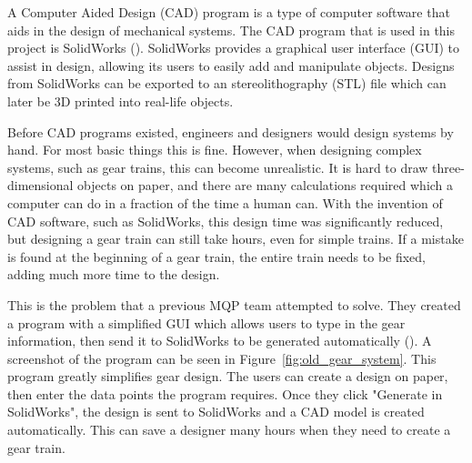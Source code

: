 \begin{doublespace}
A Computer Aided Design (CAD) program is a type of computer software that aids in the design of mechanical systems. The CAD program that is used in this project is SolidWorks (\cite{dassault_systemes_3d_2021}). SolidWorks provides a graphical user interface (GUI) to assist in design, allowing its users to easily add and manipulate objects. Designs from SolidWorks can be exported to an stereolithography (STL) file which can later be 3D printed into real-life objects.

Before CAD programs existed, engineers and designers would design systems by hand. For most basic things this is fine. However, when designing complex systems, such as gear trains, this can become unrealistic. It is hard to draw three-dimensional objects on paper, and there are many calculations required which a computer can do in a fraction of the time a human can. With the invention of CAD software, such as SolidWorks, this design time was significantly reduced, but designing a gear train can still take hours, even for simple trains. If a mistake is found at the beginning of a gear train, the entire train needs to be fixed, adding much more time to the design.

This is the problem that a previous MQP team attempted to solve. They created a program with a simplified GUI which allows users to type in the gear information, then send it to SolidWorks to be generated automatically (\cite{holman_automated_2018}). A screenshot of the program can be seen in Figure~\ref{fig:old_gear_system}. This program greatly simplifies gear design. The users can create a design on paper, then enter the data points the program requires. Once they click "Generate in SolidWorks", the design is sent to SolidWorks and a CAD model is created automatically. This can save a designer many hours when they need to create a gear train.


\end{doublespace}
